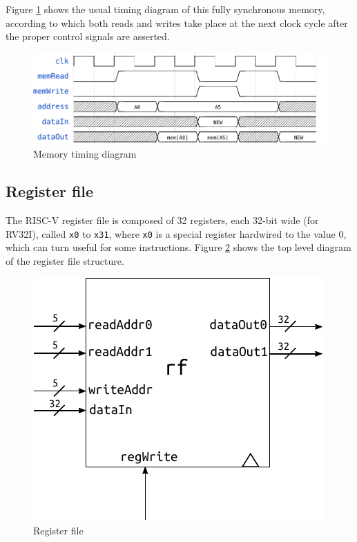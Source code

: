 \documentclass[a4paper]{article}
\begin{document}
Figure \ref{fig:memory_timing} shows the usual timing diagram of this fully synchronous memory, according to which both reads and writes take place at the next clock cycle after the proper control signals are asserted.

\begin{figure}[hbtp]
    \centering
    \includegraphics[scale=.8]{../memory/ref/timing/memory_timing.pdf}
    \caption{Memory timing diagram}
    \label{fig:memory_timing}
\end{figure}

\subsection{Register file}
The RISC-V register file is composed of 32 registers, each 32-bit wide (for RV32I), called \texttt{x0} to \texttt{x31}, where \texttt{x0} is a special register hardwired to the value 0, which can turn useful for some instructions. Figure \ref{fig:rf} shows the top level diagram of the register file structure.

\begin{figure}[hbtp]
    \centering
    \includegraphics[scale=1]{../register_file/ref/schematic/register_file.pdf}
    \caption{Register file}
    \label{fig:rf}
\end{figure}
\end{document}
